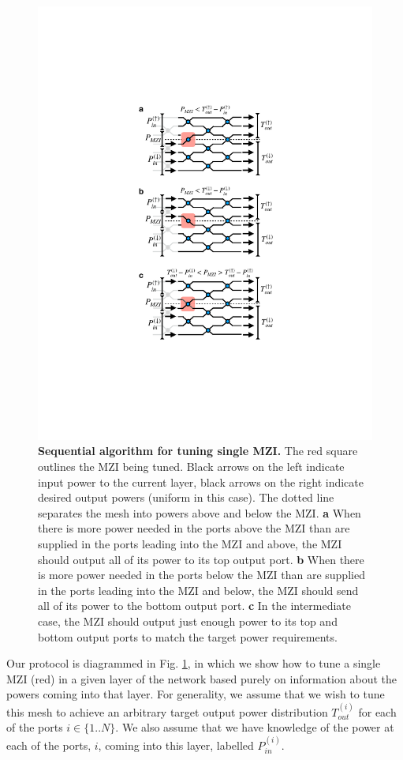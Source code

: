 \documentclass[%
 reprint,
 amsmath,amssymb,
 aps,
prstab,
floatfix,
]{revtex4-1}
\begin{document}
\begin{figure}[!ht]
\includegraphics[width=0.7\columnwidth]{Fig3.pdf}
\caption{\label{fig:algo} \textbf{Sequential algorithm for tuning single MZI.} The red square outlines the MZI being tuned.  Black arrows on the left indicate input power to the current layer, black arrows on the right indicate desired output powers (uniform in this case).  The dotted line separates the mesh into powers above and below the MZI.  \textbf{a} When there is more power needed in the ports above the MZI than are supplied in the ports leading into the MZI and above, the MZI should output all of its power to its top output port. \textbf{b} When there is more power needed in the ports below the MZI than are supplied in the ports leading into the MZI and below, the MZI should send all of its power to the bottom output port.  \textbf{c} In the intermediate case, the MZI should output just enough power to its top and bottom output ports to match the target power requirements.}
\end{figure}

Our protocol is diagrammed in Fig. \ref{fig:algo}, in which we show how to tune a single MZI (red) in a given layer of the network based purely on information about the powers coming into that layer.  For generality, we assume that we wish to tune this mesh to achieve an arbitrary target output power distribution $T_{out}^{(i)}$ for each of the ports $i \in \{1..N\}$.  We also assume that we have knowledge of the power at each of the ports, $i$, coming into this layer, labelled $P_{in}^{(i)}$.
\end{document}
